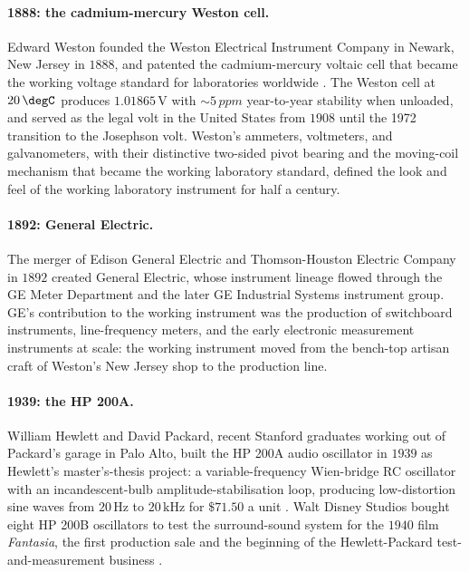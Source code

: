 \paragraph{1888: the cadmium-mercury Weston cell.} Edward Weston
founded the Weston Electrical Instrument Company in Newark, New
Jersey in $1888$, and patented the cadmium-mercury voltaic cell
that became the working voltage standard for laboratories worldwide
\cite{text:ch05t3-fink-electronics-1989}. The Weston cell at
$20 \,\degC$ produces $1.01865 \,\si{\volt}$ with
$\sim 5 \,\si{ppm}$ year-to-year stability when
unloaded, and served as the legal volt in the United States from
$1908$ until the 1972 transition to the Josephson volt. Weston's
ammeters, voltmeters, and galvanometers, with their distinctive
two-sided pivot bearing and the moving-coil mechanism that became
the working laboratory standard, defined the look and feel of the
working laboratory instrument for half a century.

\paragraph{1892: General Electric.} The merger of Edison General
Electric and Thomson-Houston Electric Company in $1892$ created
General Electric, whose instrument lineage flowed through the GE
Meter Department and the later GE Industrial Systems instrument
group. GE's contribution to the working instrument was the
production of switchboard instruments, line-frequency meters, and
the early electronic measurement instruments at scale: the
working instrument moved from the bench-top artisan craft of
Weston's New Jersey shop to the production line.

\paragraph{1939: the HP 200A.} William Hewlett and David Packard,
recent Stanford graduates working out of Packard's garage in Palo
Alto, built the HP 200A audio oscillator in $1939$ as Hewlett's
master's-thesis project: a variable-frequency Wien-bridge RC
oscillator with an incandescent-bulb amplitude-stabilisation loop,
producing low-distortion sine waves from $20 \,\si{\hertz}$ to
$20 \,\si{\kilo\hertz}$ for $\$71.50$ a unit
\cite{web:ch05t3-hp-200a-history}. Walt Disney Studios bought eight
HP 200B oscillators to test the surround-sound system for the
$1940$ film \emph{Fantasia}, the first production sale and the
beginning of the Hewlett-Packard test-and-measurement business
\cite{web:ch05t3-agilent-keysight-history}.

